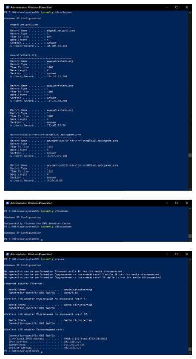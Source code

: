 \documentclass[12pt]{extarticle}
\begin{document}
\begin{figure}[H]
    \centering
    \includegraphics[width=0.90\textwidth]{displaydns.jpg}
    \caption{}
\end{figure}
\begin{figure}[H]
    \centering
    \includegraphics[width=0.90\textwidth]{flushdns.jpg}
    \caption{}
\end{figure}
\begin{figure}[H]
    \centering
    \includegraphics[width=0.90\textwidth]{renew.jpg}
    \caption{}
\end{figure}
\end{document}
